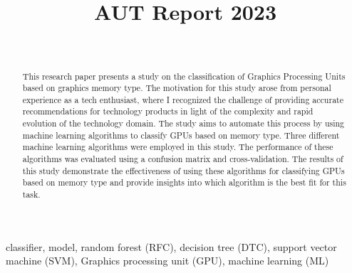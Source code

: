 \documentclass[conference,onecolumn]{IEEEtran}
\begin{document}
\title{AUT Report 2023\\}

\author{\\

}

\maketitle

\begin{abstract}
This research paper presents a study on the classification of Graphics Processing Units based on graphics memory type. The motivation for this study arose from personal experience as a tech enthusiast, where I recognized the challenge of providing accurate recommendations for technology products in light of the complexity and rapid evolution of the technology domain. The study aims to automate this process by using machine learning algorithms to classify GPUs based on memory type. Three different machine learning algorithms were employed in this study. The performance of these algorithms was evaluated using a confusion matrix and cross-validation. The results of this study demonstrate the effectiveness of using these algorithms for classifying GPUs based on memory type and provide insights into which algorithm is the best fit for this task.\\
\end{abstract}

\begin{IEEEkeywords}
classifier, model, random forest (RFC), decision tree (DTC), support vector machine (SVM), Graphics processing unit (GPU), machine learning (ML)
\end{IEEEkeywords}

\newpage
\tableofcontents

\newpage
\end{document}
